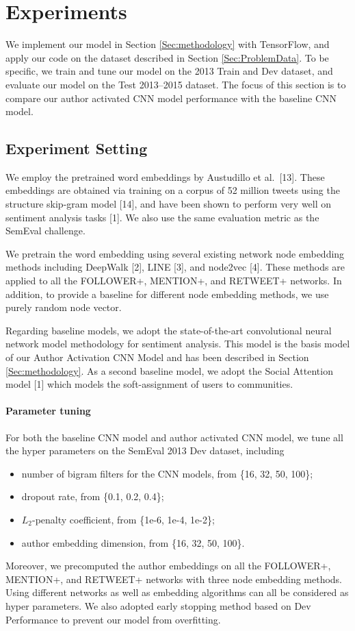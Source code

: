 

\section{Experiments}
We implement our model in Section \ref{Sec:methodology} with TensorFlow, 
and apply our code on the dataset described in Section \ref{Sec:ProblemData}. 
To be specific, we train and tune our model on the 2013 Train and Dev dataset, 
and evaluate our model on the Test 2013--2015 dataset. The focus of this section 
is to compare our author activated CNN model performance with the baseline CNN model.

\subsection{Experiment Setting}
We employ the pretrained word embeddings by Austudillo et al.\ [13]. 
These embeddings are obtained via training on a corpus of 52 million tweets
using the structure skip-gram model [14], and have been shown to
perform very well on sentiment analysis tasks [1].
We also use the same evaluation metric as the SemEval challenge.

We pretrain the word embedding using several existing network node embedding methods 
including DeepWalk [2], LINE [3], 
and node2vec [4]. These methods are applied to all the FOLLOWER+,
MENTION+, and RETWEET+ networks. In addition, to provide a baseline for different node embedding methods, 
we use purely random node vector.



Regarding baseline models, we adopt the state-of-the-art convolutional neural network model
methodology for sentiment analysis. This model is the basis model of our Author Activation CNN Model and
has been described in Section \ref{Sec:methodology}. As a second baseline model, we adopt
the Social Attention model [1] which models the soft-assignment of users to communities. 


\paragraph{Parameter tuning} 
For both the baseline CNN model and author activated CNN model, we tune all the hyper parameters 
on the SemEval 2013 Dev dataset, including
\begin{itemize}
\item number of bigram filters for the CNN models, from \{16, 32, 50, 100\};
\item dropout rate, from \{0.1, 0.2, 0.4\};
\item $L_2$-penalty coefficient, from \{1e-6, 1e-4, 1e-2\};
\item author embedding dimension, from \{16, 32, 50, 100\}.
\end{itemize}
Moreover, we precomputed the author embeddings on all the FOLLOWER+,
MENTION+, and RETWEET+ networks with three node embedding methods. Using different networks
as well as embedding algorithms can all be considered as hyper parameters.
We also adopted early stopping method based on Dev Performance to prevent our model from overfitting.

